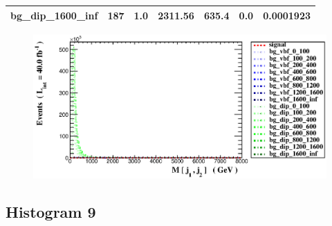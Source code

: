 \documentclass[a4paper, 10pt]{article}
\begin{document}
\begin{table}[H]
\begin{center}
\begin{tabular}{|m{23.0mm}|m{23.0mm}|m{18.0mm}|m{19.0mm}|m{19.0mm}|m{19.0mm}|m{19.0mm}|}
      \hline
      {\cellcolor{white}         bg\_dip\_1600\_inf}& {\cellcolor{white}         187}& {\cellcolor{white}         1.0}& {\cellcolor{white}         2311.56}& {\cellcolor{white}         635.4}& {\cellcolor{green}         0.0}& {\cellcolor{green}         0.0001923}\\
\hline
    \end{tabular}
  \end{center}
\end{table}

\begin{figure}[H]
  \begin{center}
    \includegraphics[scale=0.45]{selection_7.eps}\\
\caption{   }
  \end{center}
\end{figure}
      \newpage
\subsection{ Histogram 9}
\end{document}
